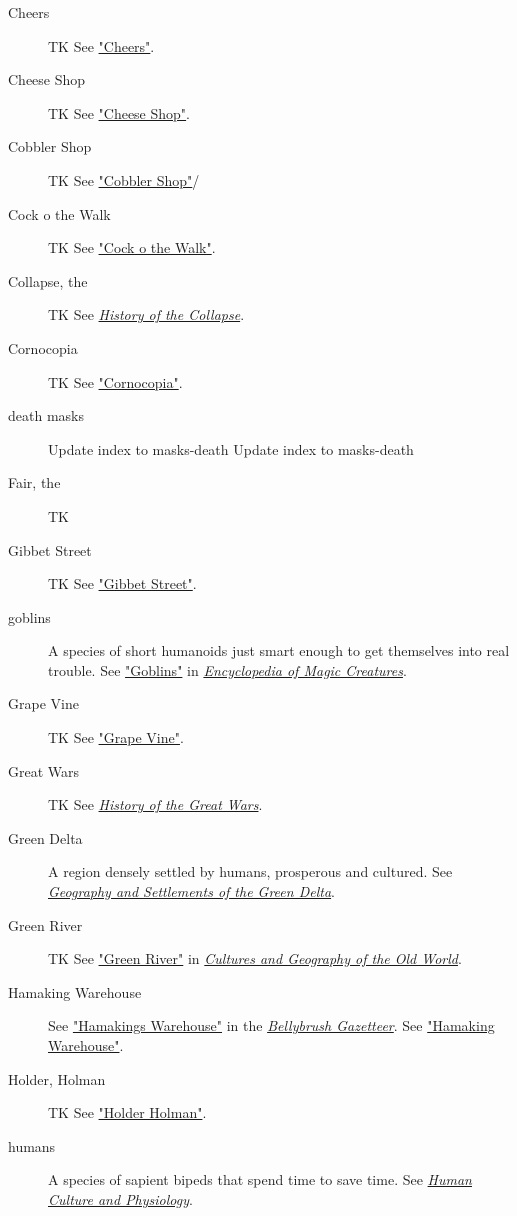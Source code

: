 \documentclass[11pt]{teraum_adventure}
\begin{document}
\begin{description}
\item[{Cheers}] TK See \hyperref[sec:orgf6e2aff]{"Cheers"}.
\item[{Cheese Shop}] TK See
\hyperref[sec:org756b4cd]{"Cheese Shop"}.
\item[{Cobbler Shop}] TK See
\hyperref[sec:org7ac5bc8]{"Cobbler Shop"}/
\item[{Cock o the Walk}] TK
See \hyperref[sec:org7c5ade1]{"Cock o the Walk"}.
\item[{Collapse, the}] TK See \href{../reference-books/history-of-the-collapse.org}{\emph{History of the Collapse}}.
\item[{Cornocopia}] TK See \hyperref[sec:org9e13bb2]{"Cornocopia"}.
\item[{death masks}] Update index to masks-death Update index to masks-death
\item[{Fair, the}] TK
\item[{Gibbet Street}] TK See
\hyperref[sec:orgfe16cc8]{"Gibbet Street"}.
\item[{goblins}] A species of short humanoids just smart enough to get themselves into real trouble. See \href{../reference-books/magic-creatures-of-teraum.org}{"Goblins"} in \href{../reference-books/encyclopedia-of-magic-creatures.org}{\emph{Encyclopedia of Magic Creatures}}.
\item[{Grape Vine}] TK See
\hyperref[sec:org9303cd8]{"Grape Vine"}.
\item[{Great Wars}] TK See \href{../reference-books/history-of-the-great-wars.org}{\emph{History of the Great Wars}}.
\item[{Green Delta}] A region densely settled by humans, prosperous and cultured. See \href{../reference-books/geography-and-settlements-of-the-green-delta.org}{\emph{Geography and Settlements of the Green Delta}}.
\item[{Green River}] TK See \href{../reference-books/cultures-and-geography-of-the-old-world.org}{"Green River"} in \href{../reference-books/cultures-and-geography-of-the-old-world.org}{\emph{Cultures and Geography of the Old World}}.
\item[{Hamaking Warehouse}] See \href{../reference-books/bellybrush/gazetteer.org}{"Hamakings Warehouse"} in the \href{../reference-books/bellybrush-gazetteer.org}{\emph{Bellybrush Gazetteer}}. See
\hyperref[sec:orgdb97110]{"Hamaking Warehouse"}.
\item[{Holder, Holman}] TK See \hyperref[sec:org964f197]{"Holder
Holman"}.
\item[{humans}] A species of sapient bipeds that spend time to save time. See \href{../reference-books/human-culture-and-physiology.org}{\emph{Human Culture and Physiology}}.

\end{description}
\end{document}

